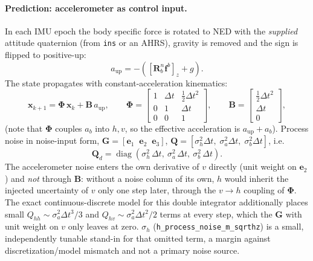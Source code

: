 \documentclass[11pt,a4paper]{article}
\newcommand{\vect}[1]{\bm{#1}}
\newcommand{\mat}[1]{\bm{#1}}
\newcommand{\nframe}{n}
\newcommand{\bframe}{b}
\newcommand{\Rbn}{\mat{R}_{\bframe}^{\nframe}}
\newcommand{\dt}{\Delta t}
\newcommand{\diag}{\operatorname{diag}}
\newcommand{\code}[1]{\texttt{#1}}
\begin{document}
\paragraph{Prediction: accelerometer as control input.} In each IMU epoch
the body specific force is rotated to NED with the \emph{supplied}
attitude quaternion (from \code{ins} or an AHRS), gravity is removed and the
sign is flipped to positive-up:
\begin{equation}
  a_{\text{up}} = -\left( \left[\Rbn\vect{f}^\bframe\right]_z
    + g \right).
\end{equation}
The state propagates with constant-acceleration kinematics:
\begin{equation}
  \vect{x}_{k+1} = \mat{\Phi}\,\vect{x}_k + \mat{B}\,a_{\text{up}},
  \qquad
  \mat{\Phi} = \begin{bmatrix}
    1 & \dt & \tfrac{1}{2}\dt^2 \\
    0 & 1 & \dt \\
    0 & 0 & 1
  \end{bmatrix},
  \qquad
  \mat{B} = \begin{bmatrix}
    \tfrac{1}{2}\dt^2 \\ \dt \\ 0
  \end{bmatrix},
\end{equation}
(note that $\mat{\Phi}$ couples $a_b$ into $h, v$, so the effective
acceleration is $a_{\text{up}} + a_b$). Process noise in noise-input
form, $\mat{G} = [\vect{e}_1\;\;\vect{e}_2\;\;\vect{e}_3]$,
$\vect{Q} = [\sigma_h^2\dt,\;\sigma_a^2\dt,\; \sigma_b^2\dt]$, i.e.
\begin{equation}
  \mat{Q}_d = \diag(\sigma_h^2\,\dt,\ \sigma_a^2\,\dt,\ \sigma_b^2\,\dt).
\end{equation}
The accelerometer noise enters the own derivative of $v$ directly (unit weight
on $\vect{e}_2$) and \emph{not} through $\mat{B}$: without a noise column of its
own, $h$ would inherit the injected uncertainty of $v$ only one step later,
through the $v\!\to\!h$ coupling of $\mat{\Phi}$. The exact continuous-discrete
model for this double integrator additionally places small
$Q_{hh}\!\sim\!\sigma_a^2\dt^3/3$ and $Q_{hv}\!\sim\!\sigma_a^2\dt^2/2$ terms
at every step, which the $\mat{G}$ with unit weight on $v$ only leaves at zero.
$\sigma_h$ (\code{h\_\allowbreak{}process\_\allowbreak{}noise\_\allowbreak{}m\_\allowbreak{}sqrthz}) is a small,
independently tunable stand-in for that omitted term, a margin against
discretization/model mismatch and not a primary noise source.
\end{document}
